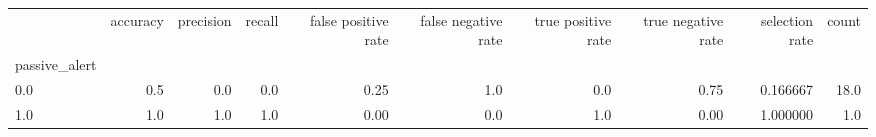 \begin{tabular}{lrrrrrrrrr}
\toprule
{} &  accuracy &  precision &  recall &  false positive rate &  false negative rate &  true positive rate &  true negative rate &  selection rate &  count \\
passive\_alert &           &            &         &                      &                      &                     &                     &                 &        \\
\midrule
0.0           &       0.5 &        0.0 &     0.0 &                 0.25 &                  1.0 &                 0.0 &                0.75 &        0.166667 &   18.0 \\
1.0           &       1.0 &        1.0 &     1.0 &                 0.00 &                  0.0 &                 1.0 &                0.00 &        1.000000 &    1.0 \\
\bottomrule
\end{tabular}
